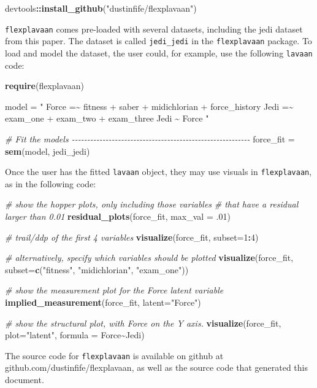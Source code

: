 \documentclass[
  english,
  man]{apa6}
\newenvironment{Shaded}{\begin{snugshade}}{\end{snugshade}}
\newcommand{\CommentTok}[1]{\textcolor[rgb]{0.56,0.35,0.01}{\textit{#1}}}
\newcommand{\DataTypeTok}[1]{\textcolor[rgb]{0.13,0.29,0.53}{#1}}
\newcommand{\DecValTok}[1]{\textcolor[rgb]{0.00,0.00,0.81}{#1}}
\newcommand{\FloatTok}[1]{\textcolor[rgb]{0.00,0.00,0.81}{#1}}
\newcommand{\KeywordTok}[1]{\textcolor[rgb]{0.13,0.29,0.53}{\textbf{#1}}}
\newcommand{\NormalTok}[1]{#1}
\newcommand{\OperatorTok}[1]{\textcolor[rgb]{0.81,0.36,0.00}{\textbf{#1}}}
\newcommand{\StringTok}[1]{\textcolor[rgb]{0.31,0.60,0.02}{#1}}
\begin{document}
\begin{Shaded}
\begin{Highlighting}[]
\NormalTok{devtools}\OperatorTok{::}\KeywordTok{install\_github}\NormalTok{(}\StringTok{"dustinfife/flexplavaan"}\NormalTok{)}
\end{Highlighting}
\end{Shaded}

\texttt{flexplavaan} comes pre-loaded with several datasets, including the jedi dataset from this paper. The dataset is called \texttt{jedi\_jedi} in the \texttt{flexplavaan} package. To load and model the dataset, the user could, for example, use the following \texttt{lavaan} code:

\begin{Shaded}
\begin{Highlighting}[]
\KeywordTok{require}\NormalTok{(flexplavaan)}

\NormalTok{model =}\StringTok{ "}
\StringTok{Force =\textasciitilde{} fitness + saber + midichlorian + force\_history}
\StringTok{Jedi =\textasciitilde{} exam\_one + exam\_two + exam\_three}
\StringTok{Jedi \textasciitilde{} Force}
\StringTok{"}

\CommentTok{\# Fit the models {-}{-}{-}{-}{-}{-}{-}{-}{-}{-}{-}{-}{-}{-}{-}{-}{-}{-}{-}{-}{-}{-}{-}{-}{-}{-}{-}{-}{-}{-}{-}{-}{-}{-}{-}{-}{-}{-}{-}{-}{-}{-}{-}{-}{-}{-}{-}{-}{-}{-}{-}{-}{-}{-}{-}{-}{-}{-}}
\NormalTok{force\_fit =}\StringTok{ }\KeywordTok{sem}\NormalTok{(model, jedi\_jedi)}
\end{Highlighting}
\end{Shaded}

Once the user has the fitted \texttt{lavaan} object, they may use visuals in \texttt{flexplavaan}, as in the following code:

\begin{Shaded}
\begin{Highlighting}[]
\CommentTok{\# show the hopper plots, only including those variables }
\CommentTok{\# that have a residual larger than 0.01}
\KeywordTok{residual\_plots}\NormalTok{(force\_fit, }\DataTypeTok{max\_val =} \FloatTok{.01}\NormalTok{)}

\CommentTok{\# trail/ddp of the first 4 variables}
\KeywordTok{visualize}\NormalTok{(force\_fit, }\DataTypeTok{subset=}\DecValTok{1}\OperatorTok{:}\DecValTok{4}\NormalTok{)}

\CommentTok{\# alternatively, specify which variables should be plotted}
\KeywordTok{visualize}\NormalTok{(force\_fit, }\DataTypeTok{subset=}\KeywordTok{c}\NormalTok{(}\StringTok{"fitness"}\NormalTok{, }\StringTok{"midichlorian"}\NormalTok{, }\StringTok{"exam\_one"}\NormalTok{))}

\CommentTok{\# show the measurement plot for the Force latent variable}
\KeywordTok{implied\_measurement}\NormalTok{(force\_fit, }\DataTypeTok{latent=}\StringTok{"Force"}\NormalTok{)}

\CommentTok{\# show the structural plot, with Force on the Y axis. }
\KeywordTok{visualize}\NormalTok{(force\_fit, }\DataTypeTok{plot=}\StringTok{"latent"}\NormalTok{, }\DataTypeTok{formula =}\NormalTok{ Force}\OperatorTok{\textasciitilde{}}\NormalTok{Jedi)}
\end{Highlighting}
\end{Shaded}

The source code for \texttt{flexplavaan} is available on github at github.com/dustinfife/flexplavaan, as well as the source code that generated this document.
\end{document}
